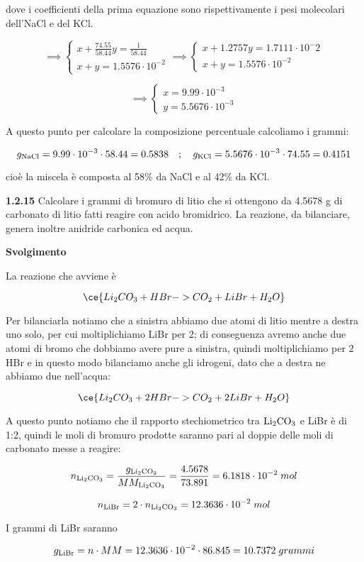dove i coefficienti della prima equazione sono rispettivamente i pesi molecolari dell'NaCl e del KCl.

$$\implies
\begin{cases}
    x + \displaystyle \frac{74.55}{58.44}y=\displaystyle \frac{1}{58.44}\\[0.2cm]
    x+y=1.5576 \cdot 10^{-2}
\end{cases}
\implies
\begin{cases}
    x + 1.2757y=1.7111 \cdot 10^-2\\
    x+y=1.5576 \cdot 10^{-2}
\end{cases}$$

$$\implies
\begin{cases}
    x=9.99 \cdot 10^{-3}\\
    y=5.5676 \cdot 10^{-3}
\end{cases}$$

A questo punto per calcolare la composizione percentuale calcoliamo i grammi:

$$g_{\rm NaCl}=9.99 \cdot 10^{-3} \cdot 58.44
=0.5838
\quad;\quad
g_{\rm KCl}=5.5676 \cdot 10^{-3} \cdot 74.55
=0.4151$$

cioè la miscela è composta al 58\% da NaCl e al 42\% da KCl.

\newpage

\vspace{0.2cm}\textbf{1.2.15} Calcolare i grammi di bromuro di litio che si ottengono da 4.5678 g di carbonato di litio fatti reagire con acido bromidrico. La reazione, da bilanciare, genera inoltre anidride carbonica ed acqua.

\vspace{0.2cm}\large\textbf{Svolgimento}\normalsize

\vspace{0.2cm}La reazione che avviene è

$$\ce{Li_2CO_3 + HBr -> CO_2 + LiBr + H_2O}$$

Per bilanciarla notiamo che a sinistra abbiamo due atomi di litio mentre a destra uno solo, per cui moltiplichiamo LiBr per 2; di conseguenza avremo anche due atomi di bromo che dobbiamo avere pure a sinistra, quindi moltiplichiamo per 2 HBr e in questo modo bilanciamo anche gli idrogeni, dato che a destra ne abbiamo due nell'acqua:

$$\ce{Li_2CO_3 + 2HBr -> CO_2 + 2LiBr + H_2O}$$

A questo punto notiamo che il rapporto stechiometrico tra $\rm Li_2CO_3$ e LiBr è di 1:2, quindi le moli di bromuro prodotte saranno pari al doppie delle moli di carbonato messe a reagire:

$$n_{\rm Li_2CO_3}
=\frac{g_{\rm Li_2CO_3}}{MM_{\rm Li_2CO_3}}
=\frac{4.5678}{73.891}=6.1818 \cdot 10^{-2}\;mol$$

$$n_{\rm LiBr}=2 \cdot n_{\rm Li_2CO_3}=12.3636 \cdot 10^{-2}\;mol$$

I grammi di LiBr saranno

$$g_{\rm LiBr}=n \cdot MM=12.3636 \cdot 10^{-2} \cdot 86.845
=10.7372\;grammi$$
